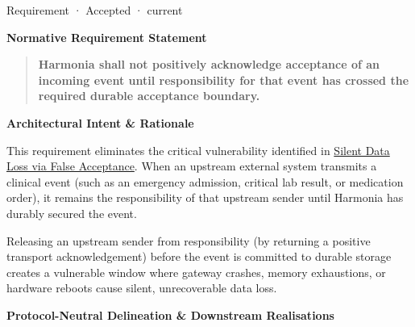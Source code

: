 \label{element:01c834537a1e41dfb523d48f287d93e9}
{\small Requirement · Accepted · current}\par

\par\medskip\textbf{Normative Requirement Statement}\par


\begin{quote}


\textbf{Harmonia shall not positively acknowledge acceptance of an incoming event until responsibility for that event has crossed the required durable acceptance boundary.}



\end{quote}


\par\medskip\textbf{Architectural Intent \& Rationale}\par


This requirement eliminates the critical vulnerability identified in \href{\detokenize{../../../../../docs/markdown/01-motivation/drivers-assessments/assessments.md}}{Silent Data Loss via False Acceptance}. When an upstream external system transmits a clinical event (such as an emergency admission, critical lab result, or medication order), it remains the responsibility of that upstream sender until Harmonia has durably secured the event.



Releasing an upstream sender from responsibility (by returning a positive transport acknowledgement) before the event is committed to durable storage creates a vulnerable window where gateway crashes, memory exhaustions, or hardware reboots cause silent, unrecoverable data loss.



\par\medskip\textbf{Protocol-Neutral Delineation \& Downstream Realisations}\par


